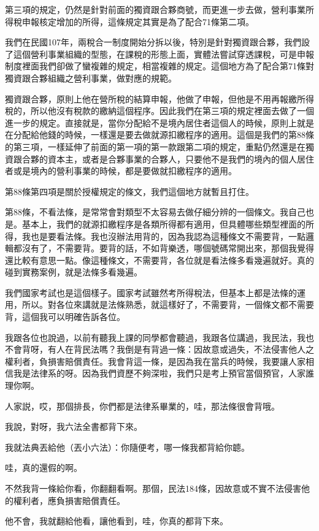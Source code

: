 \documentclass[oneside,sub3section]{ctexbook}
\begin{document}
第三項的規定，仍然是針對前面的獨資跟合夥商號，而更進一步去做，營利事業所得稅申報核定增加的所得，這條規定其實是為了配合71條第二項。

我們在民國107年，兩稅合一制度開始分拆以後，特別是針對獨資跟合夥，我們設了這個營利事業組織的型態，在課稅的形態上面，實體法嘗試穿透課稅，可是申報制度裡面我們卻做了蠻複雜的規定，相當複雜的規定。這個地方為了配合第71條對獨資跟合夥組織之營利事業，做對應的規範。

獨資跟合夥，原則上他在營所稅的結算申報，他做了申報，但他是不用再報繳所得稅的，所以他沒有稅款的繳納這個程序。因此我們在第三項的規定裡面去做了一個進一步的規定。直接就是，當你分配給不是境內居住者這個人的時候，原則上就是在分配給他錢的時候，一樣還是要去做就源扣繳程序的適用。這個是我們的第88條的第三項，一樣延伸了前面的第一項的第一款跟第二項的規定，重點仍然還是在獨資跟合夥的資本主，或者是合夥事業的合夥人，只要他不是我們的境內的個人居住者或是境內的營利事業的時候，都是要做就扣繳程序的適用。

第88條第四項是關於授權規定的條文，我們這個地方就暫且打住。

第88條，不看法條，是常常會對類型不太容易去做仔細分辨的一個條文。我自己也是。基本上，我們的就源扣繳程序是各類所得都有適用，但具體哪些類型裡面的所得，我也是要看法條。我也沒辦法用背的，因為我認為這種條文不需要背，一點邏輯都沒有了，不需要背。要背的話，不如背樂透，哪個號碼常開出來，那個我覺得還比較有意思一點。像這種條文，不需要背，各位就是看法條多看幾遍就好。真的碰到實務案例，就是法條多看幾遍。

我們國家考試也是這個樣子。國家考試雖然考所得稅法，但基本上都是法條的運用，所以。對各位來講就是法條熟悉，就這樣好了，不需要背，一個條文都不需要背，這個我可以明確告訴各位。

我跟各位也說過，以前有聽我上課的同學都會聽過，我跟各位講過，我民法，我也不會背呀，有人在背民法嗎？我倒是有背過一條：因故意或過失，不法侵害他人之權利者，負損害賠償責任。我會背這一條，是因為我在當兵的時候，我要讓人家相信我是法律系的呀。因為我們資歷不夠深啦，我們只是考上預官當個預官，人家誰理你啊。

人家説，哎，那個排長，你們都是法律系畢業的，哇，那法條很會背哦。

我說，對呀，我六法全書都背下來。

我就法典丟給他（丟小六法）：你隨便考，哪一條我都背給你聼。

哇，真的還假的啊。

不然我背一條給你看，你翻翻看啊。那個，民法184條，因故意或不實不法侵害他的權利者，應負損害賠償責任。

他不會，我就翻給他看，讓他看到，哇，你真的都背下來。
\end{document}
